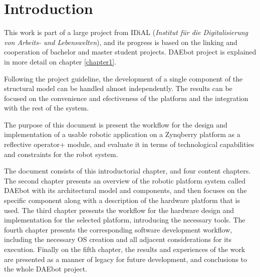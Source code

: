 
\chapter*{Introduction}

This work is part of a large project from IDiAL (\textit{Institut für die Digitalisierung von
Arbeits- und Lebens­welten}), and its progress is based on the linking and cooperation of bachelor
and master student projects. DAEbot project is explained in more detail on chapter \ref{chapter1}.

Following the project guideline, the development of a single component of the structural model can
be handled almost independently. The results can be focused on the convenience and efectiveness of
the platform and the integration with the rest of the system.

The purpose of this document is present the workflow for the design and implementation of a usable
robotic application on a Zynqberry platform as a reflective operator+ module, and evaluate it in
terms of technological capabilities and constraints for the robot system.

The document consists of this introductorial chapter, and four content chapters. The second chapter
presents an overview of the robotic platform system called DAEbot with its architectural model and
components, and then focuses on the specific component along with a description of the hardware
platform that is used. The third chapter presents the workflow for the hardware design and
implementation for the selected platform, introducing the necessary tools. The fourth chapter
presents the corresponding software development workflow, including the necessary OS creation and
all adjacent considerations for its execution. Finally on the fifth chapter, the results and
experiences of the work are presented as a manner of legacy for future development, and conclusions
to the whole DAEbot project.
